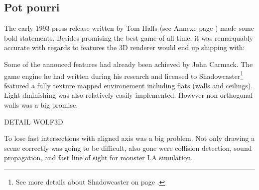 \subsection{Pot pourri}
The early 1993 press release written by Tom Halls (see Annexe page \pageref{label_press_release}) made some bold statements. Besides promising the best game of all time, it was remarquably accurate with regards to features the 3D renderer would end up shipping with:\\
\par
\par
Some of the annouced features had already been achieved by John Carmack. The game engine he had written during his research and licensed to Shadowcaster\footnote{See more details about Shadowcaster on page \pageref{label_shadowcaster}.} featured a fully texture mapped environement including flats (walls and ceilings). Light dminishing was also relatively easily implemented. However non-orthogonal walls was a big promise.\\
\par
DETAIL WOLF3D\\
\par
To lose fast intersections with aligned axis was a big problem. Not only drawing a scene correctly was going to be difficult, also gone were collision detection, sound propagation, and fast line of sight for monster I.A simulation.\\
\par
{}
